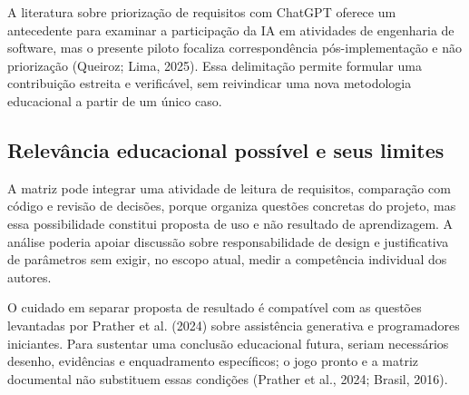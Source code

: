 A literatura sobre priorização de requisitos com ChatGPT oferece um antecedente para examinar a participação da IA em atividades de engenharia de software, mas o presente piloto focaliza correspondência pós-implementação e não priorização (Queiroz; Lima, 2025). Essa delimitação permite formular uma contribuição estreita e verificável, sem reivindicar uma nova metodologia educacional a partir de um único caso.

\subsection{Relevância educacional possível e seus limites}
A matriz pode integrar uma atividade de leitura de requisitos, comparação com código e revisão de decisões, porque organiza questões concretas do projeto, mas essa possibilidade constitui proposta de uso e não resultado de aprendizagem. A análise poderia apoiar discussão sobre responsabilidade de design e justificativa de parâmetros sem exigir, no escopo atual, medir a competência individual dos autores.

O cuidado em separar proposta de resultado é compatível com as questões levantadas por Prather et al. (2024) sobre assistência generativa e programadores iniciantes. Para sustentar uma conclusão educacional futura, seriam necessários desenho, evidências e enquadramento específicos; o jogo pronto e a matriz documental não substituem essas condições (Prather et al., 2024; Brasil, 2016).
